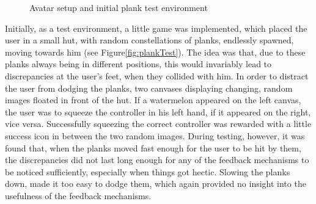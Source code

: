 \begin{figure}[h]
    \centering
    \hfill
    \caption{Avatar setup and initial plank test environment}
    \label{fig:avatarAndPlankTest}
\end{figure}

Initially, as a test environment, a little game was implemented, which placed the user in a small hut, with random constellations of planks, endlessly spawned, moving towards him (see Figure\autoref{fig:plankTest}). The idea was that, due to these planks always being in different positions, this would invariably lead to discrepancies at the user's feet, when they collided with him. In order to distract the user from dodging the planks, two canvases displaying changing, random images floated in front of the hut. If a watermelon appeared on the left canvas, the user was to squeeze the controller in his left hand, if it appeared on the right, vice versa. Successfully squeezing the correct controller was rewarded with a little success icon in between the two random images.
\newline
During testing, however, it was found that, when the planks moved fast enough for the user to be hit by them, the discrepancies did not last long enough for any of the feedback mechanisms to be noticed sufficiently, especially when things got hectic. Slowing the planks down, made it too easy to dodge them, which again provided no insight into the usefulness of the feedback mechanisms.
\newline

